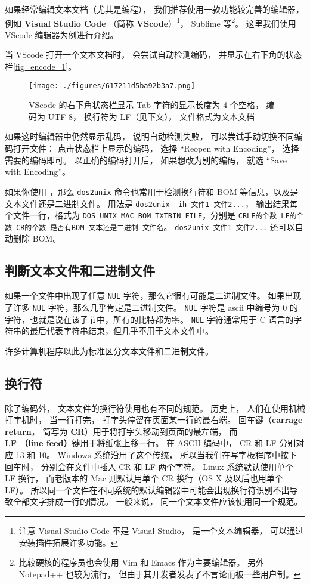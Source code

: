 如果经常编辑文本文档（尤其是编程）， 我们推荐使用一款功能较完善的编辑器， 例如 \textbf{Visual Studio Code} （简称 \textbf{VScode}）\footnote{注意 Visual Studio Code 不是 Visual Studio， 是一个文本编辑器， 可以通过安装插件拓展许多功能。}， Sublime 等\footnote{比较硬核的程序员也会使用 Vim 和 Emacs 作为主要编辑器。 另外 Notepad++ 也较为流行， 但由于其开发者发表了不言论而被一些用户制。}。 这里我们使用 VScode 编辑器为例进行介绍。

当 VScode 打开一个文本文档时， 会尝试自动检测编码， 并显示在右下角的状态栏\autoref{fig_encode_1}。
\begin{figure}[ht]
\centering
\texttt{[image: ./figures/617211d5ba92b3a7.png]}
\caption{VScode 的右下角状态栏显示 Tab 字符的显示长度为 4 个空格， 编码为 UTF-8， 换行符为 LF（见下文）， 文件格式为文本文档} \label{fig_encode_1}
\end{figure}
如果这时编辑器中仍然显示乱码， 说明自动检测失败， 可以尝试手动切换不同编码打开文件： 点击状态栏上显示的编码， 选择 “Reopen with Encoding”， 选择需要的编码即可。 以正确的编码打开后， 如果想改为别的编码， 就选 “Save with Encoding”。

如果你使用 ，那么 \verb`dos2unix` 命令也常用于检测换行符和 BOM 等信息，以及是文本文件还是二进制文件。 用法是 \verb`dos2unix -ih 文件1 文件2...`， 输出结果每个文件一行，格式为 \verb`DOS UNIX MAC BOM TXTBIN FILE`，分别是 \verb`CRLF的个数 LF的个数 CR的个数 是否有BOM 文本还是二进制 文件名`。 \verb`dos2unix 文件1 文件2...` 还可以自动删除 BOM。

\subsection{判断文本文件和二进制文件}
如果一个文件中出现了任意 \verb`NUL` 字符，那么它很有可能是二进制文件。 如果出现了许多 \verb`NUL` 字符，那么几乎肯定是二进制文件。 \verb`NUL` 字符是 ascii 中编号为 0 的字符，也就是说在该子节中，所有的比特都为零。 \verb`NUL` 字符通常用于 C 语言的字符串的最后代表字符串结束，但几乎不用于文本文件中。

许多计算机程序以此为标准区分文本文件和二进制文件。

\subsection{换行符}\label{sub_encode_1}
除了编码外， 文本文件的换行符使用也有不同的规范。 历史上， 人们在使用机械打字机时， 当一行打完， 打字头停留在页面某一行的最右端。 回车键（\textbf{carrage return}， 简写为 \textbf{CR}）用于将打字头移动到页面的最左端， 而 \textbf{LF （line feed）}键用于将纸张上移一行。 在 ASCII 编码中， CR 和 LF 分别对应 13 和 10。 Windows 系统沿用了这个传统， 所以当我们在写字板程序中按下回车时， 分别会在文件中插入 CR 和 LF 两个字符。 Linux 系统默认使用单个 LF 换行， 而老版本的 Mac 则默认用单个 CR 换行（OS X 及以后也用单个 LF）。 所以同一个文件在不同系统的默认编辑器中可能会出现换行符识别不出导致全部文字排成一行的情况。 一般来说， 同一个文本文件应该使用同一个规范。

